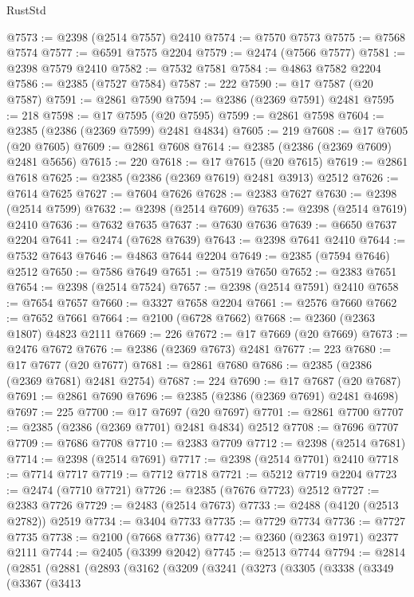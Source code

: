 \begin{lexlean}{RustStd}
\begin{coremodule}
{\begin{coremodule}
{{{{{{{{{{{{{{{{{{{{{{{{{{{{{{{{{{{{{{{{{{{{{{{{{{@7573 := @2398 (@2514 @7557) @2410
@7574 := @7570 @7573
@7575 := @7568 @7574
@7577 := @6591 @7575 @2204
@7579 := @2474 (@7566 @7577)
@7581 := @2398 @7579 @2410
@7582 := @7532 @7581
@7584 := @4863 @7582 @2204
@7586 := @2385 (@7527 @7584)
@7587 := 222
@7590 := @17 @7587 (@20 @7587)
@7591 := @2861 @7590
@7594 := @2386 (@2369 @7591) @2481
@7595 := 218
@7598 := @17 @7595 (@20 @7595)
@7599 := @2861 @7598
@7604 := @2385 (@2386 (@2369 @7599) @2481 @4834)
@7605 := 219
@7608 := @17 @7605 (@20 @7605)
@7609 := @2861 @7608
@7614 := @2385 (@2386 (@2369 @7609) @2481 @5656)
@7615 := 220
@7618 := @17 @7615 (@20 @7615)
@7619 := @2861 @7618
@7625 := @2385 (@2386 (@2369 @7619) @2481 @3913) @2512
@7626 := @7614 @7625
@7627 := @7604 @7626
@7628 := @2383 @7627
@7630 := @2398 (@2514 @7599)
@7632 := @2398 (@2514 @7609)
@7635 := @2398 (@2514 @7619) @2410
@7636 := @7632 @7635
@7637 := @7630 @7636
@7639 := @6650 @7637 @2204
@7641 := @2474 (@7628 @7639)
@7643 := @2398 @7641 @2410
@7644 := @7532 @7643
@7646 := @4863 @7644 @2204
@7649 := @2385 (@7594 @7646) @2512
@7650 := @7586 @7649
@7651 := @7519 @7650
@7652 := @2383 @7651
@7654 := @2398 (@2514 @7524)
@7657 := @2398 (@2514 @7591) @2410
@7658 := @7654 @7657
@7660 := @3327 @7658 @2204
@7661 := @2576 @7660
@7662 := @7652 @7661
@7664 := @2100 (@6728 @7662)
@7668 := @2360 (@2363 @1807) @4823 @2111
@7669 := 226
@7672 := @17 @7669 (@20 @7669)
@7673 := @2476 @7672
@7676 := @2386 (@2369 @7673) @2481
@7677 := 223
@7680 := @17 @7677 (@20 @7677)
@7681 := @2861 @7680
@7686 := @2385 (@2386 (@2369 @7681) @2481 @2754)
@7687 := 224
@7690 := @17 @7687 (@20 @7687)
@7691 := @2861 @7690
@7696 := @2385 (@2386 (@2369 @7691) @2481 @4698)
@7697 := 225
@7700 := @17 @7697 (@20 @7697)
@7701 := @2861 @7700
@7707 := @2385 (@2386 (@2369 @7701) @2481 @4834) @2512
@7708 := @7696 @7707
@7709 := @7686 @7708
@7710 := @2383 @7709
@7712 := @2398 (@2514 @7681)
@7714 := @2398 (@2514 @7691)
@7717 := @2398 (@2514 @7701) @2410
@7718 := @7714 @7717
@7719 := @7712 @7718
@7721 := @5212 @7719 @2204
@7723 := @2474 (@7710 @7721)
@7726 := @2385 (@7676 @7723) @2512
@7727 := @2383 @7726
@7729 := @2483 (@2514 @7673)
@7733 := @2488 (@4120 (@2513 @2782)) @2519
@7734 := @3404 @7733
@7735 := @7729 @7734
@7736 := @7727 @7735
@7738 := @2100 (@7668 @7736)
@7742 := @2360 (@2363 @1971) @2377 @2111
@7744 := @2405 (@3399 @2042)
@7745 := @2513 @7744
@7794 := @2814
    (@2851
      (@2881
        (@2893
          (@3162
            (@3209
              (@3241
                (@3273
                  (@3305
                    (@3338
                      (@3349
                        (@3367
                          (@3413
}}}}}}}}}}}}}}}}}}}}}}}}}}}}}}}}}}}}}}}}}}}}}}}}}}
\end{coremodule}}
\end{coremodule}
\end{lexlean}
